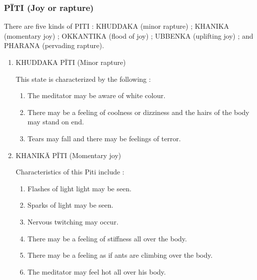 \documentclass[a5paper,10pt,english]{book}
\begin{document}
\subsubsection{PĪTI (Joy or rapture)}
\label{\detokenize{progress:piti-joy-or-rapture}}
\sphinxAtStartPar
There are five kinds of PITI : KHUDDAKA (minor rapture) ; KHANIKA (momentary joy) ; OKKANTIKA (flood of joy) ; UBBENKA (uplifting joy) ; and PHARANA (pervading rapture).
\begin{enumerate}
%
\item {} 
\sphinxAtStartPar
KHUDDAKA PĪTI (Minor rapture)

\sphinxAtStartPar
This state is characterized by the following :\sphinxhyphen{}
\begin{enumerate}
%
\item {} 
\sphinxAtStartPar
The meditator may be aware of white colour.

\item {} 
\sphinxAtStartPar
There may be a feeling of coolness or dizziness and the hairs of the body may stand on end.

\item {} 
\sphinxAtStartPar
Tears may fall and there may be feelings of terror.

\end{enumerate}

\item {} 
\sphinxAtStartPar
KHANIKĀ PĪTI (Momentary joy)

\sphinxAtStartPar
Characteristics of this Piti include :\sphinxhyphen{}
\begin{enumerate}
%
\item {} 
\sphinxAtStartPar
Flashes of light light may be seen.

\item {} 
\sphinxAtStartPar
Sparks of light may be seen.

\item {} 
\sphinxAtStartPar
Nervous twitching may occur.

\item {} 
\sphinxAtStartPar
There may be a feeling of stiffness all over the body.

\item {} 
\sphinxAtStartPar
There may be a feeling as if ants are climbing over the body.

\item {} 
\sphinxAtStartPar
The meditator may feel hot all over his body.


\end{enumerate}
\end{enumerate}
\end{document}
